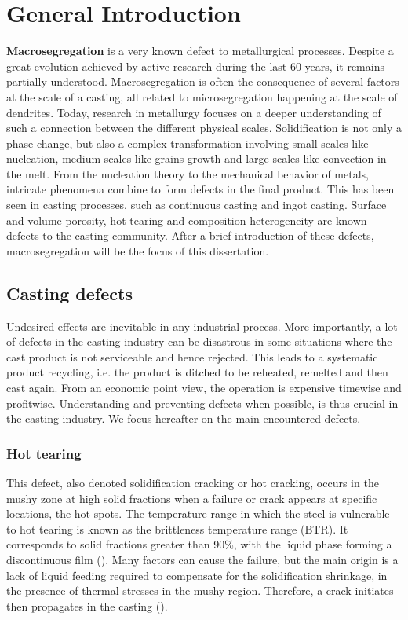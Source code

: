 \chapter{General Introduction}

\textbf{Macrosegregation} is a very known defect to metallurgical processes. Despite a great evolution achieved by active research during the last 60 years,
it remains partially understood. Macrosegregation is often  the consequence of several factors at the scale of a casting, all related to microsegregation happening at the scale
of dendrites. Today, research in metallurgy focuses on a deeper understanding of such a connection between the different physical scales.
Solidification is not only a phase change, but also a complex transformation involving small scales like nucleation, medium scales
like grains growth and large scales like convection in the melt. From the nucleation theory to the mechanical behavior of metals, intricate phenomena combine to form defects in the final product. This has been seen in casting processes, such as continuous casting and ingot casting. Surface and volume porosity, hot tearing and composition heterogeneity are known defects to the casting community. After a brief introduction of these defects, macrosegregation will be the focus of this dissertation.

\section{Casting defects}
Undesired effects are inevitable in any industrial process. More importantly, a lot of defects in the casting industry can be disastrous in some situations where the cast product is not serviceable and hence rejected. This leads to a systematic product recycling, i.e. the product is ditched to be reheated, remelted and then cast again. From an economic point view, the operation is expensive timewise and profitwise. Understanding and preventing defects when possible, is thus crucial in the casting industry.
We focus hereafter on the main encountered defects.

\subsection*{Hot tearing} 
This defect, also denoted solidification cracking or hot cracking, occurs in the mushy zone at high solid fractions when a failure
or crack appears at specific locations, the hot spots. The temperature range in which the steel is vulnerable to hot tearing is known as the brittleness temperature range (BTR). It corresponds to solid fractions greater than \num{90}\%, with the liquid phase forming a discontinuous film (). Many factors can cause the failure, but the main origin is a lack of liquid feeding required to compensate for the solidification shrinkage, in the presence of thermal stresses in the mushy region. Therefore, a crack initiates then propagates in the casting (). 

